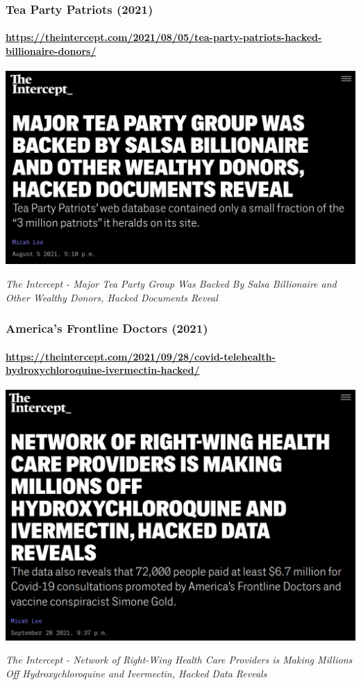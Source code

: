 \documentclass[aspectratio=169,usenames,dvipsnames]{beamer}
\begin{document}
\begin{frame}[c]
  \frametitle{Tea Party Patriots (2021)}
  \framesubtitle{\url{https://theintercept.com/2021/08/05/tea-party-patriots-hacked-billionaire-donors/}}

  \centering
  \includegraphics[width=\textwidth,height=0.7\textheight,keepaspectratio]{img/tea_party_patriots.png}

  \footnotesize
  \emph{The Intercept - Major Tea Party Group Was Backed By Salsa Billionaire
  and Other Wealthy Donors, Hacked Documents Reveal}

\end{frame}

\begin{frame}[c]
  \frametitle{America's Frontline Doctors (2021)}
  \framesubtitle{\url{https://theintercept.com/2021/09/28/covid-telehealth-hydroxychloroquine-ivermectin-hacked/}}

  \centering
  \includegraphics[width=\textwidth,height=0.7\textheight,keepaspectratio]{img/americas_frontline_doctors.png}

  \footnotesize
  \emph{The Intercept - Network of Right-Wing Health Care Providers is Making
  Millions Off Hydroxychloroquine and Ivermectin, Hacked Data Reveals}

\end{frame}
\end{document}
